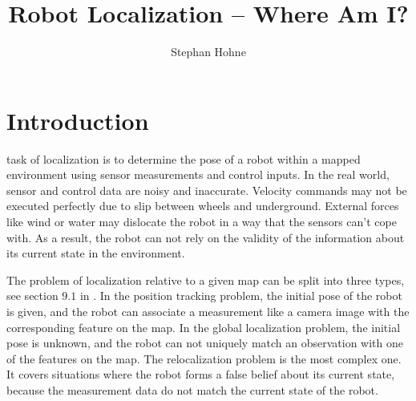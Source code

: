 \documentclass[10pt,journal,compsoc]{IEEEtran}
\begin{document}
\title{Robot Localization -- Where Am I?}
\author{Stephan Hohne}

%
{}

\maketitle
\IEEEdisplaynontitleabstractindextext
\IEEEpeerreviewmaketitle
\section{Introduction}
\label{sec:introduction}
 task of localization is to determine the pose of a robot within a mapped environment using sensor measurements and control inputs. In the real world, sensor and control data are noisy and inaccurate. Velocity commands may not be executed perfectly due to slip between wheels and underground. External forces like wind or water may dislocate the robot in a way that the sensors can't cope with. As a result, the robot can not rely on the validity of the information about its current state in the environment.

The problem of localization relative to a given map can be split into three types, see section $9.1$ in \cite{principles_of_robot_motion}. In the position tracking problem, the initial pose of the robot is given, and the robot can associate a measurement like a camera image with the corresponding feature on the map. In the global localization problem, the initial pose is unknown, and the robot can not uniquely match an observation with one of the features on the map. The relocalization problem is the most complex one. It covers situations where the robot forms a false belief about its current state, because the measurement data do not match the current state of the robot.
\end{document}
